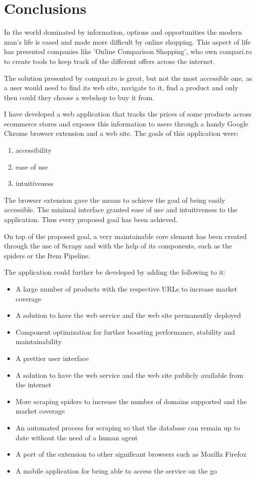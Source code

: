 \documentclass[12pt,a4paper,twoside]{report}
\begin{document}
\chapter{Conclusions}

In the world dominated by information, options and opportunities the modern man's life is eased and made more difficult by online shopping. This aspect of life has presented companies like 'Online Comparison Shopping', who own compari.ro to create tools to keep track of the different offers across the internet.

The solution presented by compari.ro is great, but not the most accessible one, as a user would need to find its web site, navigate to it, find a product and only then could they choose a webshop to buy it from.

I have developed a web application that tracks the prices of some products across ecommerce stores and exposes this information to users through a handy Google Chrome browser extension and a web site. The goals of this application were: 

\begin{enumerate}
  \item accessibility
  \item ease of use
  \item intuitiveness
\end{enumerate}

The browser extension gave the means to achieve the goal of being easily accessible. The minimal interface granted ease of use and intuitiveness to the application. Thus every proposed goal has been achieved.

On top of the proposed goal, a very maintainable core element has been created through the use of Scrapy and with the help of its components, such as the spiders or the Item Pipeline.

The application could further be developed by adding the following to it:

\begin{itemize}
  \item A large number of products with the respective URLs to increase market coverage
  \item A solution to have the web service and the web site permanently deployed
  \item Component optimization for further boosting performance, stability and maintainability
  \item A prettier user interface
  \item A solution to have the web service and the web site publicly available from the internet
  \item More scraping spiders to increase the number of domains supported and the market coverage
  \item An automated process for scraping so that the database can remain up to date without the need of a human agent
  \item A port of the extension to other significant browsers such as Mozilla Firefox
  \item A mobile application for being able to access the service on the go
\end{itemize}






\end{document}
